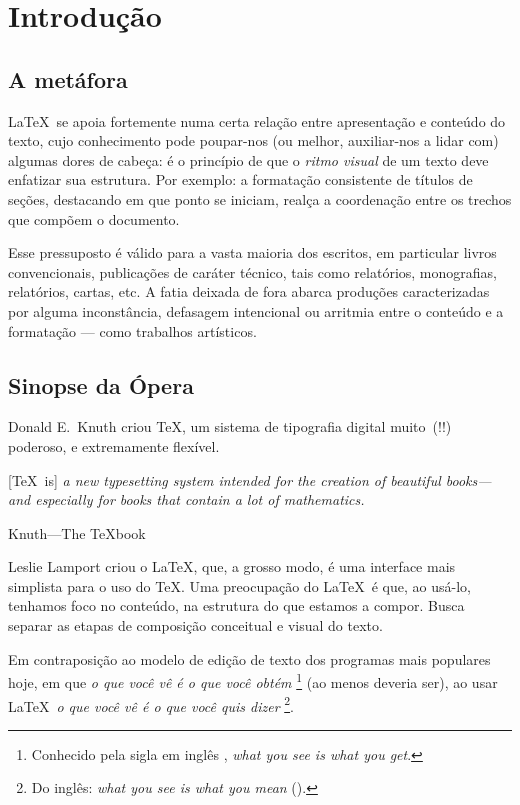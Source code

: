 \section{Introdução}

\subsection{A metáfora}

\LaTeX\ se apoia fortemente numa certa relação entre apresentação e
conteúdo do texto, cujo
conhecimento pode poupar-nos (ou melhor, auxiliar-nos a lidar com)
algumas dores de cabeça: é o princípio de que o \emph{ritmo visual} de
um texto deve enfatizar sua estrutura. Por exemplo: a formatação
consistente de títulos de seções, destacando em que ponto se iniciam,
realça a coordenação entre os trechos que compõem o documento.

Esse pressuposto é válido para a vasta maioria dos escritos, em
particular livros convencionais, publicações de caráter técnico,
tais como relatórios, monografias,  relatórios, cartas, etc. A fatia
deixada de fora abarca produções caracterizadas por alguma
inconstância, defasagem intencional ou arritmia entre o conteúdo e a
formatação --- como trabalhos artísticos.


\subsection{Sinopse da Ópera}

Donald E.~Knuth criou \TeX, um sistema de tipografia digital muito~(!!)
poderoso, e extremamente flexível.

\begin{center}
\begin{minipage}{.75\textwidth}
  [\TeX\ is] \textit{a new typesetting system intended for the creation of
  beautiful books---and especially for books that contain a lot of
  mathematics.}

  \hfill Knuth---The \TeX book
\end{minipage}
\end{center}

  
Leslie Lamport criou o \LaTeX, que, a grosso modo, é uma interface
mais simplista para o uso do \TeX. Uma preocupação do \LaTeX\ é que,
ao usá-lo, tenhamos foco no conteúdo, na estrutura do que estamos a
compor. Busca separar as etapas de composição conceitual e visual do
texto.

Em contraposição ao modelo de edição de texto dos programas mais
populares hoje, em que 
\emph{o que você vê é o que você obtém}%
\footnote{Conhecido pela sigla em inglês ,
  \emph{what you see is what you get}.} (ao menos deveria ser), ao usar
\LaTeX\ \emph{o que você vê é o que você quis dizer}%
\footnote{Do inglês: \emph{what you see is what you mean} ().}.



